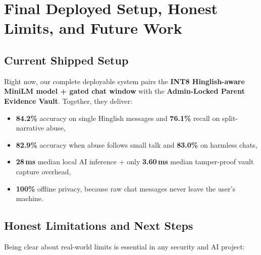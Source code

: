 \documentclass[11pt,a4paper]{article}
\begin{document}
\section{Final Deployed Setup, Honest Limits, and Future Work}

\subsection{Current Shipped Setup}
Right now, our complete deployable system pairs the \textbf{INT8 Hinglish-aware MiniLM model + gated chat window} with the \textbf{Admin-Locked Parent Evidence Vault}. Together, they deliver:
\begin{itemize}
  \item \textbf{84.2\%} accuracy on single Hinglish messages and \textbf{76.1\%} recall on split-narrative abuse,
  \item \textbf{82.9\%} accuracy when abuse follows small talk and \textbf{83.0\%} on harmless chats,
  \item \textbf{28\,ms} median local AI inference + only \textbf{3.60\,ms} median tamper-proof vault capture overhead,
  \item \textbf{100\%} offline privacy, because raw chat messages never leave the user's machine.
\end{itemize}

\subsection{Honest Limitations and Next Steps}
Being clear about real-world limits is essential in any security and AI project:
\end{document}
